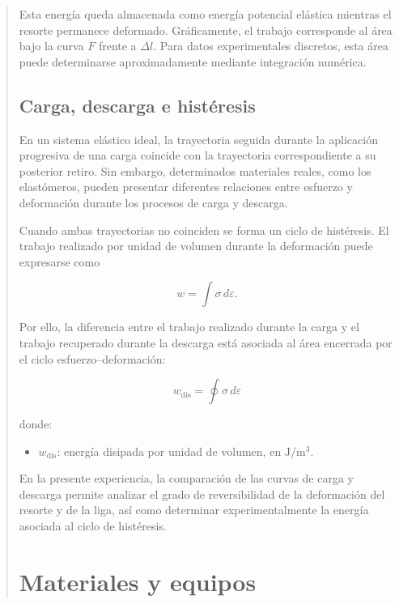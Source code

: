 \documentclass[11pt,a4paper]{article}
\begin{document}
\begin{quote}
Esta energía queda almacenada como energía potencial elástica mientras el
resorte permanece deformado. Gráficamente, el trabajo corresponde al área
bajo la curva $F$ frente a $\Delta l$. Para datos experimentales discretos,
esta área puede determinarse aproximadamente mediante integración numérica.


\subsection{Carga, descarga e histéresis}

En un sistema elástico ideal, la trayectoria seguida durante la aplicación
progresiva de una carga coincide con la trayectoria correspondiente a su
posterior retiro. Sin embargo, determinados materiales reales, como los
elastómeros, pueden presentar diferentes relaciones entre esfuerzo y
deformación durante los procesos de carga y descarga.

Cuando ambas trayectorias no coinciden se forma un ciclo de histéresis. El
trabajo realizado por unidad de volumen durante la deformación puede
expresarse como

\[
w=\int \sigma\,d\varepsilon.
\]

Por ello, la diferencia entre el trabajo realizado durante la carga y el
trabajo recuperado durante la descarga está asociada al área encerrada por
el ciclo esfuerzo--deformación:

\begin{equation}
\boxed{
w_{\mathrm{dis}}=
\oint \sigma\,d\varepsilon
}
\label{eq:histeresis}
\end{equation}

donde:

\begin{itemize}
    \item $w_{\mathrm{dis}}$: energía disipada por unidad de volumen,
    en $\mathrm{J/m^3}$.
\end{itemize}

En la presente experiencia, la comparación de las curvas de carga y descarga
permite analizar el grado de reversibilidad de la deformación del resorte y
de la liga, así como determinar experimentalmente la energía asociada al
ciclo de histéresis.
\par
\endgroup


\newpage
\section{Materiales y equipos}
\begingroup
\setlength{\leftskip}{1.5em}

\end{quote}
\end{document}
